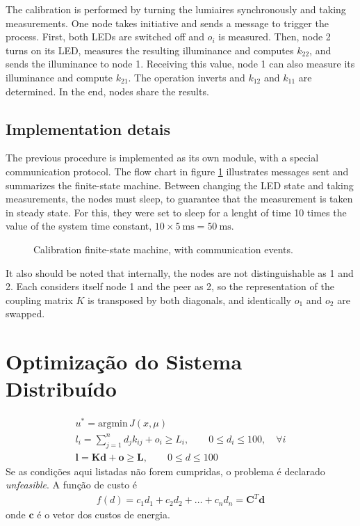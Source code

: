 \documentclass{article}
\newcommand{\matr}[1]{\mathbf{#1}}
\begin{document}
The calibration is performed by turning the lumiaires synchronously and taking measurements. One node takes initiative and sends a message to trigger the process. First, both LEDs are switched off and $o_i$ is measured.
Then, node 2 turns on its LED, measures the resulting illuminance and computes $k_{22}$, and sends the illuminance to node 1. Receiving this value, node 1 can also measure its illuminance and compute $k_{21}$. The operation inverts and $k_{12}$ and $k_{11}$ are determined. In the end, nodes share the results.

\subsection{Implementation detais}

The previous procedure is implemented as its own module, with a special communication protocol. The flow chart in figure \ref{fig:cal} illustrates messages sent and summarizes the finite-state machine.
Between changing the LED state and taking measurements, the nodes must sleep, to guarantee that the measurement is taken in steady state. For this, they were set to sleep for a lenght of time 10 times the value of the system time constant, $10 \times \SI{5}{\milli \second} = \SI{50}{\milli \second}$. 

\begin{figure}[ht]
  \centering
  \caption{Calibration finite-state machine, with communication events.}
  \label{fig:cal}
\end{figure}

It also should be noted that internally, the nodes are not distinguishable as 1 and 2. Each considers itself node 1 and the peer as 2, so the representation of the coupling matrix $K$ is transposed by both diagonals, and identically $o_1$ and $o_2$ are swapped.

\section{Optimização do Sistema Distribuído}

\begin{gather*}
	u^* = \textrm{argmin}\,J(x, \mu) \\
	l_i = \sum^n_{j=1} d_j k_{ij} + o_i \geq L_i, \qquad 0 \leq d_i \leq 100, \quad \forall i \\
	\matr{l} = \matr{K}\matr{d} + \matr{o} \geq \matr{L}, \qquad 0 \leq d \leq 100
\end{gather*}
Se as condições aqui listadas não forem cumpridas, o problema é declarado \textit{unfeasible}. A função de custo é
\begin{gather*}
	f(d) = c_1d_1 + c_2d_2 + \ldots + c_nd_n = \matr{C}^T\matr{d}
\end{gather*}
onde $\matr{c}$ é o vetor dos custos de energia.
\end{document}
